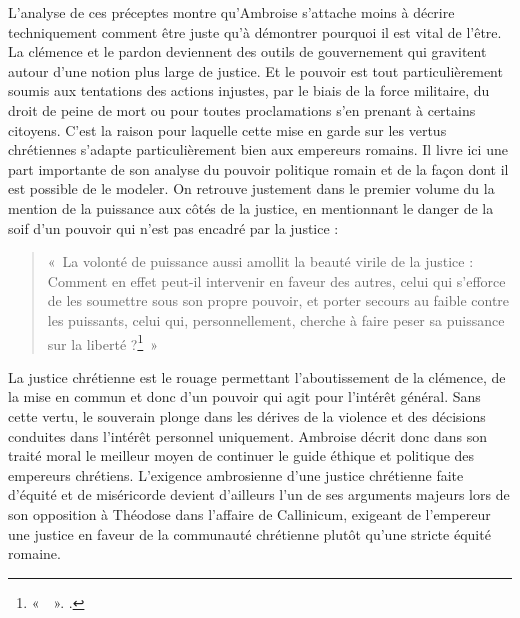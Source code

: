 \bigskip

L'analyse de ces préceptes montre qu'Ambroise s'attache moins à décrire techniquement comment être juste qu'à démontrer pourquoi il est vital de l'être. La clémence et le pardon deviennent des outils de gouvernement qui gravitent autour d'une notion plus large de justice. Et le pouvoir est tout particulièrement soumis aux tentations des actions injustes, par le biais de la force militaire, du droit de peine de mort ou pour toutes proclamations s'en prenant à certains citoyens. C'est la raison pour laquelle cette mise en garde sur les vertus chrétiennes s'adapte particulièrement bien aux empereurs romains. Il livre ici une part importante de son analyse du pouvoir politique romain et de la façon dont il est possible de le modeler. On retrouve justement dans le premier volume du  la mention de la puissance aux côtés de la justice, en mentionnant le danger de la soif d'un pouvoir qui n'est pas encadré par la justice :

\bigskip

\begin{quote}
    «~La volonté de puissance aussi amollit la beauté virile de la justice : Comment en effet peut-il intervenir en faveur des autres, celui qui s’efforce de les soumettre sous son propre pouvoir, et porter secours au faible contre les puissants, celui qui, personnellement, cherche à faire peser sa puissance sur la liberté ?\footnote{«~~». \cite[\nopp I, 138]{ambroise_devoirs_1}.}~»
\end{quote}

\bigskip

La justice chrétienne est le rouage permettant l'aboutissement de la clémence, de la mise en commun et donc d'un pouvoir qui agit pour l'intérêt général. Sans cette vertu, le souverain plonge dans les dérives de la violence et des décisions conduites dans l'intérêt personnel uniquement. Ambroise décrit donc dans son traité moral le meilleur moyen de continuer le guide éthique et politique des empereurs chrétiens. L'exigence ambrosienne d'une justice chrétienne faite d'équité et de miséricorde devient d'ailleurs l'un de ses arguments majeurs lors de son opposition à Théodose dans l'affaire de Callinicum, exigeant de l'empereur une justice en faveur de la communauté chrétienne plutôt qu'une stricte équité romaine.


